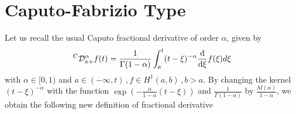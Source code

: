 \documentclass[twoside]{book}
\begin{document}
{\section{Caputo-Fabrizio Type}
Let us recall the usual Caputo fractional derivative of order $\alpha$, given by
\begin{equation}
    \label{UsualD}
    ^{C}\mathcal{D}^{\alpha}_{a+} f(t) = \frac{1}{\Gamma{(1-\alpha)}} \int_a^t (t-\xi)^{-\alpha} \dv{}{\xi}f(\xi)d\xi
\end{equation}
with $\alpha \in [0,1)$ and $a \in (-\infty ,t) \, , f \in H^1(a,b) \, ,b>a$. By changing the kernel $(t-\xi)^{-\alpha}$ with the function $\exp(- \frac{\alpha}{1-\alpha}(t-\xi))$ and $\frac{1}{\Gamma{(1-\alpha)}}$ by $\frac{M(\alpha)}{1-\alpha}$, we obtain the following new definition of fractional derivative

}
\end{document}
